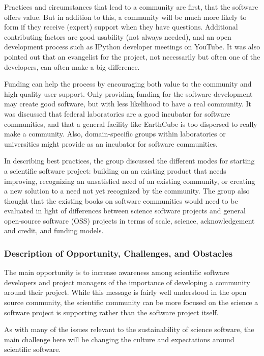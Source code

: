 Practices and circumstances that lead to a community are first, that the
software offers value. But in addition to this, a community will be much more
likely to form if they receive (expert) support when they have questions.
Additional contributing factors are good usability (not always needed), and an
open development process such as IPython developer meetings on YouTube. It was
also pointed out that an evangelist for the project, not necessarily but often
one of the developers, can often make a big difference.

Funding can help the process by encouraging both value to the community and
high-quality user support. Only providing funding for the software development
may create good software, but with less likelihood to have a real community. It
was discussed that federal laboratories are a good incubator for software
communities, and that a general facility like EarthCube is too dispersed to
really make a community. Also, domain-specific groups within laboratories or
universities might provide as an incubator for software communities.

In describing best practices, the group discussed the different modes for
starting a scientific software project: building on an existing product that
needs improving, recognizing an unsatisfied need of an existing community, or
creating a new solution to a need not yet recognized by the community. The group
also thought that the existing books on software communities would need to be
evaluated in light of differences between science software projects and general
open-source software (OSS) projects in terms of scale, science, acknowledgement and credit, and funding
models.


\subsubsection{Description of Opportunity, Challenges, and Obstacles}

The main opportunity is to increase awareness among scientific
software developers and project managers of the importance of
developing a community around their project.
While this message is fairly well understood in the open source
community, the scientific community can be more focused on the
science a software project is supporting rather than the software
project itself.

As with many of the issues relevant to the sustainability of science
software, the main challenge here will be changing the culture and
expectations around scientific software.

